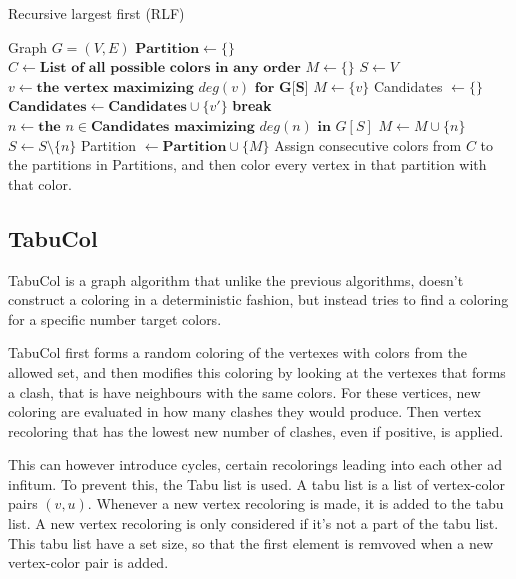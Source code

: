 \documentclass{amsart}
\newcommand{\algorithmicbreak}{\textbf{break}}
\newcommand{\BREAK}{\STATE \algorithmicbreak}
\begin{document}
\begin{algorithm}[H]
    \caption{Recursive largest first (RLF)}
  \label{alg:modmin}
  \begin{algorithmic}[1]
      \REQUIRE Graph $G = (V,E)$
      \STATE $\textbf{Partition} \leftarrow \{\}$
      \STATE $C \leftarrow \textbf{List of all possible colors in any order}$
      \STATE $M \leftarrow \{\}$
      \STATE $S \leftarrow V$
        \STATE $v \leftarrow \textbf{the vertex maximizing $deg(v)$ for G[S]} $
        \STATE $M \leftarrow \{v\}$
            \STATE Candidates $\leftarrow \{\}$
                    \STATE $\textbf{Candidates} \leftarrow \textbf{Candidates}
                    \cup \{v'\}$
                \ENDIF
            \ENDFOR
                \BREAK
            \ENDIF
            \STATE $n \leftarrow \textbf{the $n \in \textbf{Candidates}$ maximizing $deg(n)$ in $G[S]$}$ 
            \STATE $M \leftarrow M \cup \{n\}$
            \STATE $S \leftarrow S \setminus \{n\}$
        \ENDWHILE
        \STATE Partition $\leftarrow \textbf{Partition} \cup \{M\}$ 
      \ENDWHILE
      \STATE Assign consecutive colors from $C$ to the partitions in Partitions,
      and then color every vertex in that partition with that color.
  \end{algorithmic}
\end{algorithm}

\subsection{TabuCol}

TabuCol is a graph algorithm that unlike the previous algorithms, doesn't
construct a coloring in a deterministic fashion, but instead tries to find a
coloring for a specific number target colors.

TabuCol first forms a random coloring of the vertexes with colors from the
allowed set, and then modifies this coloring by looking at the vertexes that
forms a clash, that is have neighbours with the same colors. For these vertices,
new coloring are evaluated in how many clashes they would produce. Then vertex
recoloring that has the lowest new number of clashes, even if positive, is
applied.

This can however introduce cycles, certain recolorings leading into each other
ad infitum. To prevent this, the Tabu list is used. A tabu list is a list 
of vertex-color pairs $(v,u)$. Whenever a new vertex recoloring is made, it is
added to the tabu list. A new vertex recoloring is only considered if it's not a
part of the tabu list. This tabu list have a set size, so that the first element
is remvoved when a new vertex-color pair is added.
\end{document}

